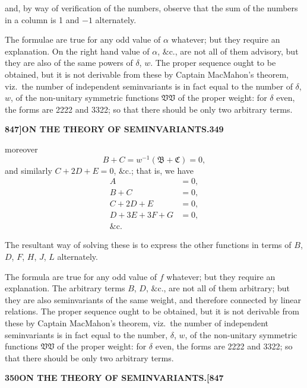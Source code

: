 \documentclass[12pt,a4paper]{article}
\theoremstyle{definition}
\begin{document}
and, by way of verification of the numbers, observe that the sum of the numbers in a column is 1 and $-1$ alternately.

The formulae are true for any odd value of $\alpha$ whatever; but they require an explanation. On the right hand value of $\alpha$, $\&\text{c.}$, are not all of them advisory, but they are also of the same powers of $\delta$, $w$. The proper sequence ought to be obtained, but it is not derivable from these by Captain MacMahon's theorem, viz.\ the number of independent seminvariants is in fact equal to the number of $\delta$, $w$, of the non-unitary symmetric functions $\mathfrak{V}\mathfrak{V}$ of the proper weight: for $\delta$ even, the forms are 2222 and 3322; so that there should be only two arbitrary terms.

\newpage
\setcounter{page}{349}

\noindent\textbf{847]}\hfill\textbf{ON THE THEORY OF SEMINVARIANTS.}\hfill\textbf{349}

\bigskip

\noindent moreover
\[
B + C = w^{-1}(\mathfrak{B} + \mathfrak{C}) = 0,
\]
and similarly $C + 2D + E = 0$, $\&\text{c.}$; that is, we have
\begin{align*}
A &= 0, \\
B + C &= 0, \\
C + 2D + E &= 0, \\
D + 3E + 3F + G &= 0, \\
\&\text{c.}
\end{align*}

The resultant way of solving these is to express the other functions in terms of $B$, $D$, $F$, $H$, $J$, $L$ alternately.

The formula are true for any odd value of $f$ whatever; but they require an explanation. The arbitrary terms $B$, $D$, $\&\text{c.}$, are not all of them arbitrary; but they are also seminvariants of the same weight, and therefore connected by linear relations. The proper sequence ought to be obtained, but it is not derivable from these by Captain MacMahon's theorem, viz.\ the number of independent seminvariants is in fact equal to the number, $\delta$, $w$, of the non-unitary symmetric functions $\mathfrak{V}\mathfrak{V}$ of the proper weight: for $\delta$ even, the forms are 2222 and 3322; so that there should be only two arbitrary terms.

\newpage
\setcounter{page}{350}

\noindent\textbf{350}\hfill\textbf{ON THE THEORY OF SEMINVARIANTS.}\hfill\textbf{[847}
\end{document}
